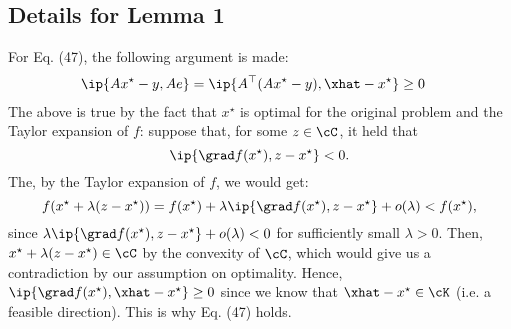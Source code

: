 \documentclass[a4paper]{article}
\newcommand{\xstar}{x^{\star}}
\begin{document}
\subsection*{Details for Lemma 1}
For Eq. (47), the following argument is made:
\begin{align*}
    \ip{A\xstar - y, Ae} &= \ip{A^\top (A\xstar - y), \xhat - \xstar} \geq 0
\end{align*}
The above is true by the fact that $\xstar$ is optimal for the
original problem and the Taylor expansion of $f$: suppose that, for some $z \in
\cC$, it held that
\[
    \ip{\grad f(\xstar), z - \xstar} < 0.
\]
The, by the Taylor expansion of $f$, we would get:
\[
    f(\xstar + \lambda (z - \xstar)) =
    f(\xstar) + \lambda \ip{\grad f(\xstar), z - \xstar} + o(\lambda)
    < f(\xstar),
\]
since $\lambda \ip{\grad f(\xstar), z - \xstar} + o(\lambda) < 0$ for
sufficiently small $\lambda > 0$. Then, $\xstar + \lambda (z - \xstar) \in \cC$
by the convexity of $\cC$, which would give us a contradiction by our assumption
on optimality. Hence, $\ip{\grad f(\xstar), \xhat - \xstar} \geq 0$ since we
know that $\xhat - \xstar \in \cK$ (i.e. a feasible direction).
This is why Eq. (47) holds.
\end{document}
